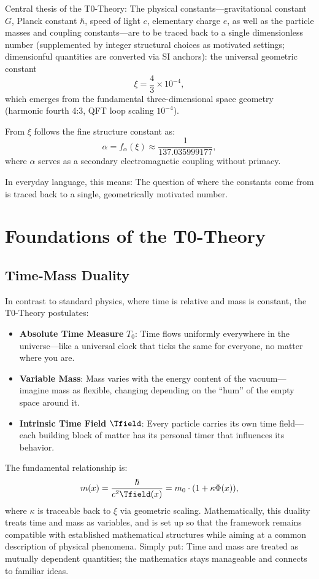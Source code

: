 	\begin{keyresult}
		Central thesis of the T0-Theory: The physical constants—gravitational constant $G$, Planck constant $\hbar$, speed of light $c$, elementary charge $e$, as well as the particle masses and coupling constants—are to be traced back to a single dimensionless number (supplemented by integer structural choices as motivated settings; dimensionful quantities are converted via SI anchors): the universal geometric constant
		\[
		\xi = \frac{4}{3} \times 10^{-4},
		\]
		which emerges from the fundamental three-dimensional space geometry (harmonic fourth 4:3, QFT loop scaling $10^{-4}$).

		From $\xi$ follows the fine structure constant as:
		\[
		\alpha = f_\alpha(\xi) \approx \frac{1}{137.035999177},
		\]
		where $\alpha$ serves as a secondary electromagnetic coupling without primacy.
	\end{keyresult}
	
	In everyday language, this means: The question of where the constants come from is traced back to a single, geometrically motivated number.
	
	\section{Foundations of the T0-Theory}
	\subsection{Time-Mass Duality}
	In contrast to standard physics, where time is relative and mass is constant, the T0-Theory postulates:
	\begin{itemize}
		\item \textbf{Absolute Time Measure} $T_0$: Time flows uniformly everywhere in the universe—like a universal clock that ticks the same for everyone, no matter where you are.
		\item \textbf{Variable Mass}: Mass varies with the energy content of the vacuum—imagine mass as flexible, changing depending on the ``hum'' of the empty space around it.
		\item \textbf{Intrinsic Time Field} $\Tfield$: Every particle carries its own time field—each building block of matter has its personal timer that influences its behavior.
	\end{itemize}
	
	The fundamental relationship is:
	\[
	m(x) = \frac{\hbar}{c^2 \Tfield(x)} = m_0 \cdot (1 + \kappa \Phi(x)),
	\]
	where $\kappa$ is traceable back to $\xi$ via geometric scaling. Mathematically, this duality treats time and mass as variables, and is set up so that the framework remains compatible with established mathematical structures while aiming at a common description of physical phenomena. Simply put: Time and mass are treated as mutually dependent quantities; the mathematics stays manageable and connects to familiar ideas.
	
